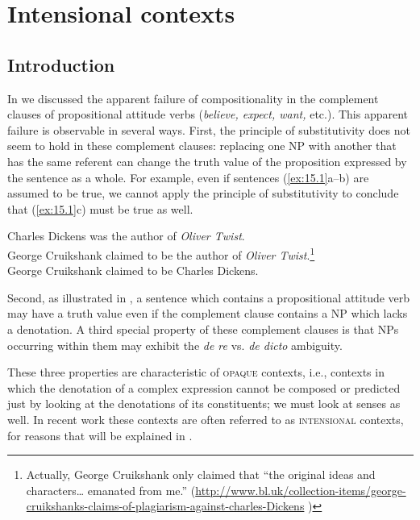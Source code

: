 \chapter{Intensional contexts}\label{sec:15}

\section{Introduction}\label{sec:15.1}

In  we discussed the apparent failure of compositionality in the complement clauses of propositional attitude verbs (\textit{believe, expect, want,} etc.). This apparent failure is observable in several ways. First, the principle of substitutivity does not seem to hold in these complement clauses: replacing one NP with another that has the same referent can change the truth value of the proposition expressed by the sentence as a whole. For example, even if sentences (\ref{ex:15.1}a--b) are assumed to be true, we cannot apply the principle of substitutivity to conclude that (\ref{ex:15.1}c) must be true as well.


\ea \label{ex:15.1}
\ea  Charles Dickens was the author of \textit{Oliver Twist}.\\
\ex George Cruikshank claimed to be the author of \textit{Oliver Twist}.\footnote{Actually, George Cruikshank only claimed that “the original ideas and characters… emanated from me.” (\url{http://www.bl.uk/collection-items/george-cruikshanks-claims-of-plagiarism-against-charles-Dickens} )}\\
\ex George Cruikshank claimed to be Charles Dickens.
                       \z
\z


Second, as illustrated in , a sentence which contains a propositional attitude verb may have a truth value even if the complement clause contains a NP which lacks a denotation. A third special property of these complement clauses is that NPs occurring within them may exhibit the \textit{de re} vs. \textit{de dicto} ambiguity.



These three properties are characteristic of \textsc{opaque} contexts, i.e., contexts in which the denotation of a complex expression cannot be composed or predicted just by looking at the denotations of its constituents; we must look at senses as well. In recent work these contexts are often referred to as \textsc{intensional} contexts, for reasons that will be explained in .



